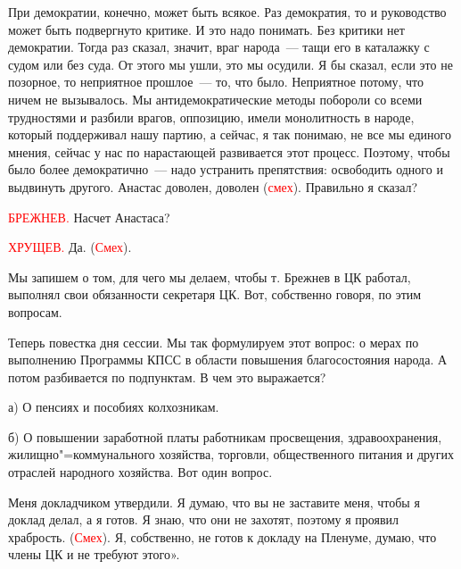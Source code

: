 \documentclass{kursa4}
\begin{document}
      {При демократии, конечно, может быть всякое. Раз демократия, то и руководство может быть подвергнуто критике. И это надо понимать. Без критики нет демократии. Тогда раз сказал, значит, враг народа~--- тащи его в каталажку с судом или без суда. От этого мы ушли, это мы осудили. Я бы сказал, если это не позорное, то неприятное прошлое~--- то, что было. Неприятное потому, что ничем не вызывалось. Мы антидемократические методы побороли со всеми трудностями и разбили врагов, оппозицию, имели монолитность в народе, который поддерживал нашу партию, а сейчас, я так понимаю, не все мы единого мнения, сейчас у нас по нарастающей развивается этот процесс. Поэтому, чтобы было более демократично~--- надо устранить препятствия: освободить одного и выдвинуть другого. Анастас доволен, доволен (}\textcolor{red}{смех}{). Правильно я сказал?}

      \textcolor{red}{БРЕЖНЕВ.}{
      Насчет Анастаса?}

      \textcolor{red}{ХРУЩЕВ.}{
      Да. (}\textcolor{red}{Смех}{).}

      {Мы запишем о том, для чего мы делаем, чтобы т. Брежнев в ЦК работал, выполнял свои обязанности секретаря ЦК. Вот, собственно говоря, по этим вопросам.}

      {Теперь повестка дня сессии. Мы так формулируем этот вопрос: о мерах по выполнению Программы КПСС в области повышения благосостояния народа. А потом разбивается по подпунктам. В чем это выражается?}

      {а) О пенсиях и пособиях колхозникам.}

      {б) О повышении заработной платы работникам просвещения, здравоохранения, жилищно"=коммунального хозяйства, торговли, общественного питания и других отраслей народного хозяйства. Вот один вопрос.}

      {Меня докладчиком утвердили. Я думаю, что вы не заставите меня, чтобы я доклад делал, а я готов. Я знаю, что они не захотят, поэтому я проявил храбрость. (}\textcolor{red}{Смех}{). Я, собственно, не готов к докладу на Пленуме, думаю, что члены ЦК и не требуют этого».}

\end{document}
